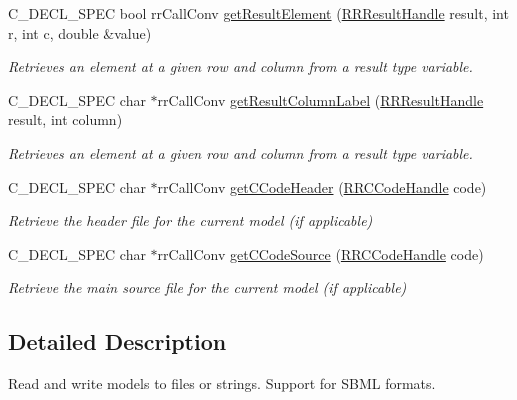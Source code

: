 \begin{DoxyCompactItemize}
\-C\-\_\-\-D\-E\-C\-L\-\_\-\-S\-P\-E\-C bool rr\-Call\-Conv \hyperlink{group__loadsave_gab8f77529dcd45bef9ebe627b88831d52}{get\-Result\-Element} (\hyperlink{rr__c__types_8h_a8c364bbdef9aab31c89655c38461da51}{\-R\-R\-Result\-Handle} result, int r, int c, double \&value)
\begin{DoxyCompactList}\small\item\em \-Retrieves an element at a given row and column from a result type variable. \end{DoxyCompactList}\item 
\-C\-\_\-\-D\-E\-C\-L\-\_\-\-S\-P\-E\-C char $\ast$rr\-Call\-Conv \hyperlink{group__loadsave_ga9ddbfbe25f45e7232d0526bf51147fd3}{get\-Result\-Column\-Label} (\hyperlink{rr__c__types_8h_a8c364bbdef9aab31c89655c38461da51}{\-R\-R\-Result\-Handle} result, int column)
\begin{DoxyCompactList}\small\item\em \-Retrieves an element at a given row and column from a result type variable. \end{DoxyCompactList}\item 
\-C\-\_\-\-D\-E\-C\-L\-\_\-\-S\-P\-E\-C char $\ast$rr\-Call\-Conv \hyperlink{group__loadsave_ga071cb3c138a8aaf96992daec8fd6a7c2}{get\-C\-Code\-Header} (\hyperlink{rr__c__types_8h_aaaa74f20722a48f3ae9ed5bdbb6c8a86}{\-R\-R\-C\-Code\-Handle} code)
\begin{DoxyCompactList}\small\item\em \-Retrieve the header file for the current model (if applicable) \end{DoxyCompactList}\item 
\-C\-\_\-\-D\-E\-C\-L\-\_\-\-S\-P\-E\-C char $\ast$rr\-Call\-Conv \hyperlink{group__loadsave_gabb964f1aad030deee67c313d9bdf3520}{get\-C\-Code\-Source} (\hyperlink{rr__c__types_8h_aaaa74f20722a48f3ae9ed5bdbb6c8a86}{\-R\-R\-C\-Code\-Handle} code)
\begin{DoxyCompactList}\small\item\em \-Retrieve the main source file for the current model (if applicable) \end{DoxyCompactList}\end{DoxyCompactItemize}


\subsection{\-Detailed \-Description}
\-Read and write models to files or strings. \-Support for \-S\-B\-M\-L formats. 

